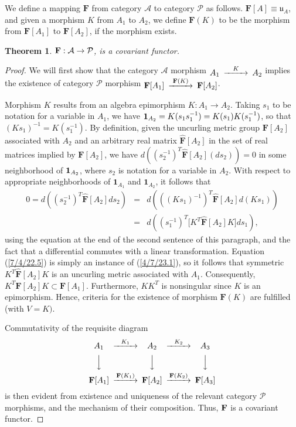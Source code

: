 \documentclass{amsart}
\numberwithin{equation}{section}
\newtheorem{theorem}{Theorem}
\theoremstyle{definition}
\numberwithin{theorem}{section}
\begin{document}
We define a mapping $\mathbf{F}$ from category $\mathcal{A}$ to category $\mathcal{P}$ as follows.  $\mathbf{F}[
A] \equiv \mathfrak{u}_A$, and given a morphism $K$ from $A_1$ to $A_2$, we define $\mathbf{F}(K)$ to be the morphism from $\mathbf{F}[A_1]$ to $\mathbf{F}[A_2]$, if the morphism exists.   

\begin{theorem}\label{6/13/22.1}  ${\bf F}: \mathcal{A}\rightarrow \mathcal{P}$, is a covariant functor. 
 \end{theorem}
 \begin{proof}
We will first show that the category $\mathcal{A}$ morphism $ \begin{CD}  A_1 @>K>> A_2\end{CD}$ implies the existence of category $\mathcal{P}$ morphism $ \begin{CD}  {\bf F}[A_1] @>{\bf F}(K)>> {\bf F}[A_2]\end{CD}$.

Morphism $K$ results from an algebra epimorphism $K:A_1\rightarrow A_2$.   Taking $s_1$ to be notation for a variable in $A_1$, we have ${\bf 1}_{A_2} = K(s_1s_1^{-1}) = K(s_1)K(s_1^{-1})$, so that $(Ks_1)^{-1} = K(s_1^{-1})$.  By definition, given the uncurling metric group $\mathbf{F}[A_2]$ associated with $A_2$ and an arbitrary real matrix  $\hat{\mathbf{F}}[A_2]$ in the set of real matrices implied by $\mathbf{F}[A_2]$, we have $d\left((s_2^{-1})^T\hat{\mathbf{F}}[A_2] (ds_2)\right) = 0$ in some neighborhood of ${\bf 1}_{A_2}$, where $s_2$ is notation for a variable in $A_2$.   With respect to appropriate neighborhoods of $\mathbf{1}_{A_1}$ and $\mathbf{1}_{A_2}$, it follows that \begin{eqnarray}\nonumber 0 = d\left((s_2^{-1})^T\hat{\mathbf{F}}[A_2] ds_2\right) &=&  d\left(((Ks_1)^{-1})^T\hat{\mathbf{F}}[A_2] d(Ks_1)\right) \\  &=& d\left((s_1^{-1})^T \big[K^T \hat{\mathbf{F}}[A_2]K\big]ds_1\right), \label{7/4/22.5}  \end{eqnarray}   using the equation at the end of the second sentence of this paragraph, and the fact that a differential commutes with a linear transformation.  Equation (\ref{7/4/22.5}) is simply an instance of (\ref{4/7/23.1}), so it follows that symmetric $K^T \hat{\mathbf{F}}[A_2]K$ is an uncurling metric associated with $A_1$.  Consequently, $K^T\mathbf{F}[A_2]K\subset \mathbf{F}[A_1]$.  Furthermore, $KK^T$ is nonsingular since $K$ is an epimorphism.  Hence, criteria for the existence of morphism $\mathbf{F}(K)$ are fulfilled (with $V=K)$.

Commutativity of the requisite diagram
  \[  \begin{CD}  
A_1 @>K_1>> A_2 @>K_2>> A_3\\
 @VVV   @VVV  @VVV\\
 {\bf F}[A_1]   @>{\bf F}(K_1)>>  {\bf F}[A_2]  @>{\bf F}(K_2)>>  {\bf F}[A_3] \\ 
 \end{CD} \]
is then evident from existence and uniqueness of the relevant category $\mathcal{P}$ morphisms, and the mechanism of their composition.  Thus, ${\bf F}$ is a covariant functor. 
\end{proof}
\end{document}
